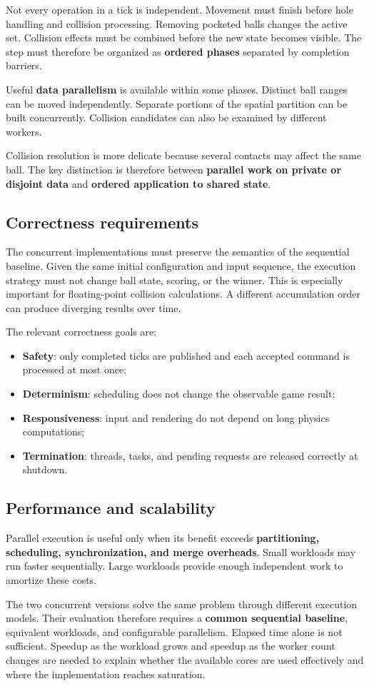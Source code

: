 Not every operation in a tick is independent. Movement must finish before hole
handling and collision processing. Removing pocketed balls changes the active
set. Collision effects must be combined before the new state becomes visible.
The step must therefore be organized as \textbf{ordered phases} separated by
completion barriers.

Useful \textbf{data parallelism} is available within some phases. Distinct ball
ranges can be moved independently. Separate portions of the spatial partition
can be built concurrently. Collision candidates can also be examined by
different workers.

Collision resolution is more delicate because several contacts may affect the
same ball. The key distinction is therefore between \textbf{parallel work on
private or disjoint data} and \textbf{ordered application to shared state}.

\subsection{Correctness requirements}

The concurrent implementations must preserve the semantics of the sequential
baseline. Given the same initial configuration and input sequence, the
execution strategy must not change ball state, scoring, or the winner. This is
especially important for floating-point collision calculations. A different
accumulation order can produce diverging results over time.

The relevant correctness goals are:

\begin{itemize}
    \item \textbf{Safety}: only completed ticks are published and each accepted command is processed at most once;
    \item \textbf{Determinism}: scheduling does not change the observable game result;
    \item \textbf{Responsiveness}: input and rendering do not depend on long physics computations;
    \item \textbf{Termination}: threads, tasks, and pending requests are released correctly at shutdown.
\end{itemize}

\subsection{Performance and scalability}

Parallel execution is useful only when its benefit exceeds
\textbf{partitioning, scheduling, synchronization, and merge overheads}. Small
workloads may run faster sequentially. Large workloads provide enough
independent work to amortize these costs.

The two concurrent versions solve the same problem through different execution
models. Their evaluation therefore requires a \textbf{common sequential
baseline}, equivalent workloads, and configurable parallelism. Elapsed time
alone is not sufficient. Speedup as the workload grows and speedup as the
worker count changes are needed to explain whether the available cores are used
effectively and where the implementation reaches saturation.
